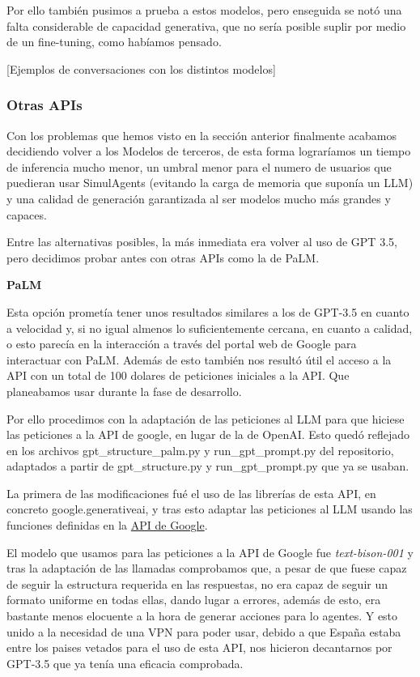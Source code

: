 Por ello también pusimos a prueba a estos modelos, pero enseguida se notó una falta considerable de capacidad generativa, que no sería posible suplir por medio de un fine-tuning, como habíamos pensado.

[Ejemplos de conversaciones con los distintos modelos]

\subsubsection{Otras APIs}

Con los problemas que hemos visto en la sección anterior finalmente acabamos decidiendo volver a los Modelos de terceros, de esta forma lograríamos un tiempo de inferencia mucho menor, un umbral menor para el numero de usuarios que puedieran usar SimulAgents (evitando la carga de memoria que suponía un LLM) y una calidad de generación garantizada al ser modelos mucho más grandes y capaces.

Entre las alternativas posibles, la más inmediata era volver al uso de GPT 3.5, pero decidimos probar antes con otras APIs como la de PaLM.

\textbf{PaLM}

Esta opción prometía tener unos resultados similares a los de GPT-3.5 en cuanto a velocidad y, si no igual almenos lo suficientemente cercana, en cuanto a calidad, o esto parecía en la interacción a través del portal web de Google para interactuar con PaLM. Además de esto también nos resultó útil el acceso a la API con un total de 100 dolares de peticiones iniciales a la API. Que planeabamos usar durante la fase de desarrollo.

Por ello procedimos con la adaptación de las peticiones al LLM para que hiciese las peticiones a la API de google, en lugar de la de OpenAI. Esto quedó reflejado en los archivos gpt\_structure\_palm.py y run\_gpt\_prompt.py del repositorio, adaptados a partir de gpt\_structure.py y run\_gpt\_prompt.py que ya se usaban.

La primera de las modificaciones fué el uso de las librerías de esta API, en concreto google.generativeai, y tras esto adaptar las peticiones al LLM usando las funciones definidas en la \href{https://ai.google.dev/palm_docs}{API de Google}.

El modelo que usamos para las peticiones a la API de Google fue \textit{text-bison-001} y tras la adaptación de las llamadas comprobamos que, a pesar de que fuese capaz de seguir la estructura requerida en las respuestas, no era capaz de seguir un formato uniforme en todas ellas, dando lugar a errores, además de esto, era bastante menos elocuente a la hora de generar acciones para lo agentes. Y esto unido a la necesidad de una VPN para poder usar, debido a que España estaba entre los paises vetados para el uso de esta API, nos hicieron decantarnos por GPT-3.5 que ya tenía una eficacia comprobada.

